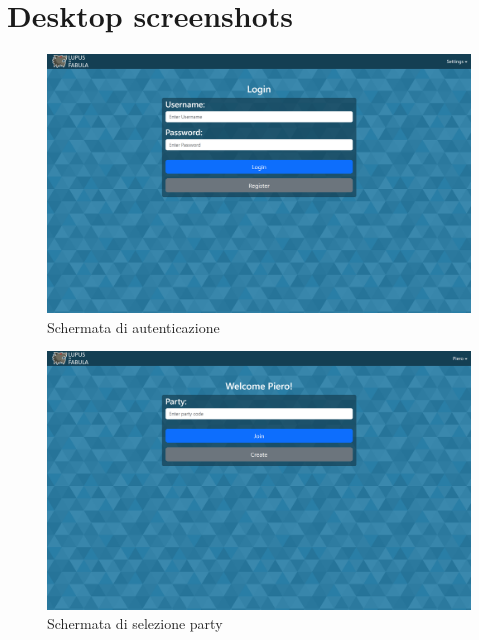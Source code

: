 \chapter{Desktop screenshots}\label{appendix:desktop}

\begin{figure}[H]
\centering
\includegraphics[width=\textwidth]{img/screen/desktop/login_desktop.png}
\caption{Schermata di autenticazione}
\label{fig:login_desktop}
\end{figure}

\begin{figure}[H]
\centering
\includegraphics[width=\textwidth]{img/screen/desktop/party_desktop.png}
\caption{Schermata di selezione party}
\label{fig:party_desktop}
\end{figure}

